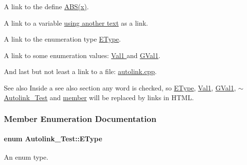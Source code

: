 A link to the define \hyperlink{autolink_8cpp_a996f7be338ccb40d1a2a5abc1ad61759}{A\+B\+S(x)}.

A link to a variable \hyperlink{class_autolink___test_a8de85603114bc9b9e53bd40764e9b499}{using another text} as a link.

A link to the enumeration type \hyperlink{class_autolink___test_aeb611627c332d067bded1806b1bb45c2}{E\+Type}.

A link to some enumeration values\+: \hyperlink{class_autolink___test_aeb611627c332d067bded1806b1bb45c2af70631e295bce280e74762d18af47a94}{Val1 } and \hyperlink{autolink_8cpp_a656d63cf384d2a6f23c2c18523a7bc5ea0f016f49e4f3bcd072319b9d68bc927d}{G\+Val1}.

And last but not least a link to a file\+: \hyperlink{autolink_8cpp}{autolink.\+cpp}.

\begin{DoxySeeAlso}{See also}
Inside a see also section any word is checked, so \hyperlink{class_autolink___test_aeb611627c332d067bded1806b1bb45c2}{E\+Type}, \hyperlink{class_autolink___test_aeb611627c332d067bded1806b1bb45c2af70631e295bce280e74762d18af47a94}{Val1}, \hyperlink{autolink_8cpp_a656d63cf384d2a6f23c2c18523a7bc5ea0f016f49e4f3bcd072319b9d68bc927d}{G\+Val1}, \hyperlink{class_autolink___test_a03bf46c8e2b733680035f524fd7b193b}{$\sim$\+Autolink\+\_\+\+Test} and \hyperlink{class_autolink___test_a393ea281f235a2f603d98daf72b0d411}{member} will be replaced by links in H\+T\+ML. 
\end{DoxySeeAlso}


\subsubsection{Member Enumeration Documentation}
\paragraph[{\texorpdfstring{E\+Type}{EType}}]{\setlength{\rightskip}{0pt plus 5cm}enum {\bf Autolink\+\_\+\+Test\+::\+E\+Type}}\hypertarget{class_autolink___test_aeb611627c332d067bded1806b1bb45c2}{}\label{class_autolink___test_aeb611627c332d067bded1806b1bb45c2}


An enum type. 


